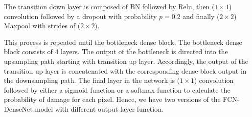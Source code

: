 The transition down layer is composed of BN followed by Relu, then (\(1\times1\)) convolution followed by a dropout with probability \(p = 0.2\) and finally (\(2\times2\)) Maxpool with strides of (\(2\times2\)).

This process is repeated until the bottleneck dense block.
The bottleneck dense block consists of 4 layers.
The output of the bottleneck is directed into the upsampling path starting with transition up layer.
Accordingly, the output of the transition up layer is concatenated with the corresponding dense block output in the downsampling path.
The final layer in the network is  (\(1\times1\)) convolution followed by either a sigmoid function or a softmax function to calculate the probability of damage for each pixel.
Hence, we have two versions of the FCN-DenseNet model with different output layer function.


